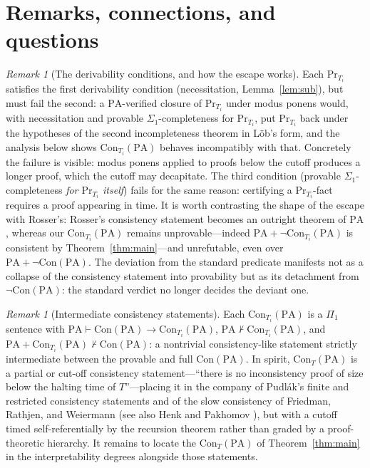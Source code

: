\documentclass[11pt]{amsart}
\theoremstyle{definition}
\theoremstyle{remark}
\newtheorem{remark}[theorem]{Remark}
\newcommand{\PA}{\mathrm{PA}}
\newcommand{\Con}{\mathrm{Con}}
\newcommand{\Prov}{\mathrm{Pr}}
\begin{document}
\section{Remarks, connections, and questions}\label{sec:remarks}

\begin{remark}[The derivability conditions, and how the escape works]
\label{rem:HBL}
Each $\Prov_{T_i}$ satisfies the first derivability condition
(necessitation, Lemma~\ref{lem:sub}), but must fail the second: a
$\PA$-verified closure of $\Prov_{T_i}$ under modus ponens would, with
necessitation and provable $\Sigma_1$-completeness for $\Prov_{T_i}$,
put $\Prov_{T_i}$ back under the hypotheses of the second incompleteness
theorem in L\"ob's form, and the analysis below shows $\Con_{T_i}(\PA)$
behaves incompatibly with that. Concretely the failure is visible:
modus ponens applied to proofs below the cutoff produces a longer proof,
which the cutoff may decapitate. The third condition (provable
$\Sigma_1$-completeness \emph{for $\Prov_{T_i}$ itself}) fails for the
same reason: certifying a $\Prov_{T_i}$-fact requires a proof appearing
in time. It is worth contrasting the shape of the escape with Rosser's:
Rosser's consistency statement becomes an outright theorem of $\PA$,
whereas our $\Con_{T_i}(\PA)$ remains unprovable---indeed
$\PA+\neg\Con_{T_i}(\PA)$ is consistent by Theorem~\ref{thm:main}---and
unrefutable, even over $\PA+\neg\Con(\PA)$. The deviation from the
standard predicate manifests not as a collapse of the consistency
statement into provability but as its detachment from $\neg\Con(\PA)$:
the standard verdict no longer decides the deviant one.
\end{remark}

\begin{remark}[Intermediate consistency statements]\label{rem:intermediate}
Each $\Con_{T_i}(\PA)$ is a $\Pi_1$ sentence with
$\PA\vdash\Con(\PA)\to\Con_{T_i}(\PA)$,
$\PA\nvdash\Con_{T_i}(\PA)$, and
$\PA+\Con_{T_i}(\PA)\nvdash\Con(\PA)$: a nontrivial consistency-like
statement strictly intermediate between the provable and full
$\Con(\PA)$. In spirit, $\Con_T(\PA)$ is a partial or cut-off consistency
statement---``there is no inconsistency proof of size below the halting
time of $T$''---placing it in the company of Pudl\'ak's finite and
restricted consistency statements \cite{Pudlak1985} and of the slow
consistency of Friedman, Rathjen, and Weiermann \cite{FRW2013} (see also
Henk and Pakhomov \cite{HenkPakhomov}), but with a cutoff timed
self-referentially by the recursion theorem rather than graded by a
proof-theoretic hierarchy. It remains to locate the
$\Con_{T}(\PA)$ of Theorem~\ref{thm:main} in the interpretability degrees
alongside those statements. %
\end{remark}
\end{document}

